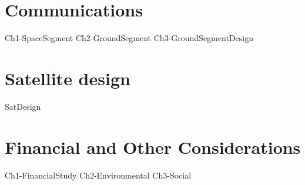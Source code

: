 
\part{Communications}
{Ch1-SpaceSegment}
{Ch2-GroundSegment}
{Ch3-GroundSegmentDesign}

\part{Satellite design}
{SatDesign}

\part{Financial and Other Considerations}
{Ch1-FinancialStudy}
{Ch2-Environmental}
{Ch3-Social}






 

